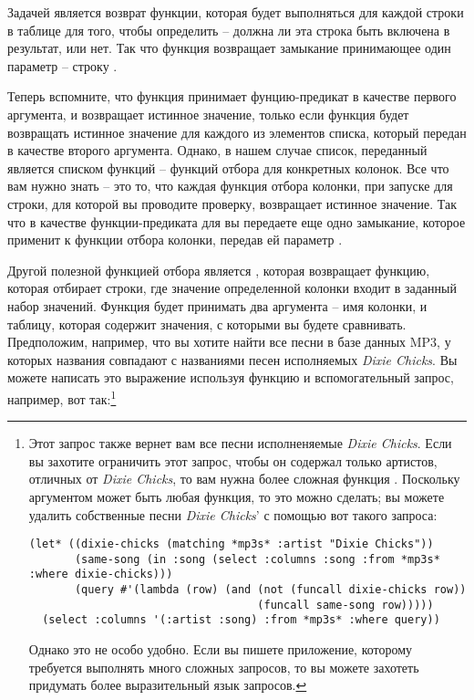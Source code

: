 Задачей  является возврат функции, которая будет выполняться для каждой
строки в таблице для того, чтобы определить -- должна ли эта строка быть включена в
результат, или нет.  Так что функция  возвращает замыкание принимающее один
параметр -- строку .

Теперь вспомните, что функция  принимает фунцию-предикат в качестве первого
аргумента, и возвращает истинное значение, только если функция будет возвращать истинное
значение для каждого из элементов списка, который передан  в качестве второго
аргумента.  Однако, в нашем случае список, переданный  является списком
функций -- функций отбора для конкретных колонок.  Все что вам нужно знать -- это то, что
каждая функция отбора колонки, при запуске для строки, для которой вы проводите проверку,
возвращает истинное значение.  Так что в качестве функции-предиката для  вы
передаете еще одно замыкание, которое применит  к функции отбора колонки,
передав ей параметр .

Другой полезной функцией отбора является , которая возвращает функцию, которая
отбирает строки, где значение определенной колонки входит в заданный набор значений.
Функция  будет принимать два аргумента -- имя колонки, и таблицу, которая
содержит значения, с которыми вы будете сравнивать.  Предположим, например, что вы хотите
найти все песни в базе данных MP3, у которых названия совпадают с названиями песен
исполняемых \textit{Dixie Chicks}.  Вы можете написать это выражение 
используя функцию  и вспомогательный запрос, например, вот так:\footnote{Этот
  запрос также вернет вам все песни исполненяемые \textit{Dixie Chicks}.  Если вы захотите
  ограничить этот запрос, чтобы он содержал только артистов, отличных от \textit{Dixie
    Chicks}, то вам нужна более сложная функция .  Поскольку аргументом
   может быть любая функция, то это можно сделать; вы можете удалить
  собственные песни \textit{Dixie Chicks}' с помощью вот такого запроса:

\begin{lstlisting}
(let* ((dixie-chicks (matching *mp3s* :artist "Dixie Chicks"))
       (same-song (in :song (select :columns :song :from *mp3s* :where dixie-chicks)))
       (query #'(lambda (row) (and (not (funcall dixie-chicks row)) 
                                   (funcall same-song row)))))
  (select :columns '(:artist :song) :from *mp3s* :where query))
\end{lstlisting}

Однако это не особо удобно.  Если вы пишете приложение, которому требуется выполнять много
сложных запросов, то вы можете захотеть придумать более выразительный язык запросов.}

